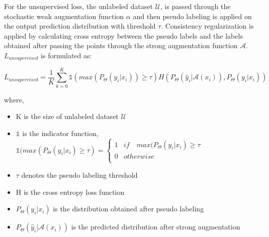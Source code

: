 For the unsupervised loss, the unlabeled dataset $\mathcal{U}$, is passed through the stochastic weak augmentation function $\alpha$ and then pseudo labeling is applied on the output prediction distribution with threshold $\tau$. Consistency regularization is applied by calculating cross entropy between the pseudo labels and the labels obtained after passing the points through the strong augmentation function $\mathcal{A}$. $L_{unsupervised}$ is formulated as:

\begin{equation}
    \label{equation:fixmatch_unsupervised_loss}
    L_{unsupervised} = \frac{1}{K} \sum_{k=0}^{K} \mathbb{1}(max(P_{\Theta}(y_i | x_i)) \geq \tau) H(P_{\Theta}(\hat{y}_i | \mathcal{A}(x_i)), P_{\Theta}(y_i | x_i))
\end{equation}

where,
\begin{itemize}[label={}]
  \setlength\itemsep{0em}
  \item K is the size of unlabeled dataset $\mathcal{U}$
  \item $\mathbb{1}$ is the indicator function, $\mathbb{1}(max(P_{\Theta}(y_i | x_i) \geq \tau) = \begin{cases} 
      1 & if \quad max(P_{\Theta}(y_i | x_i) \geq \tau \\
      0 & otherwise \\
   \end{cases}$ 
   \item $\tau$ denotes the pseudo labeling threshold 
   \item H is the cross entropy loss function
   \item $P_{\Theta}(y_i | x_i)$ is the distribution obtained after pseudo labeling
   \item $P_{\Theta}(\hat{y}_i | \mathcal{A}(x_i))$ is the predicted distribution after strong augmentation
\end{itemize}